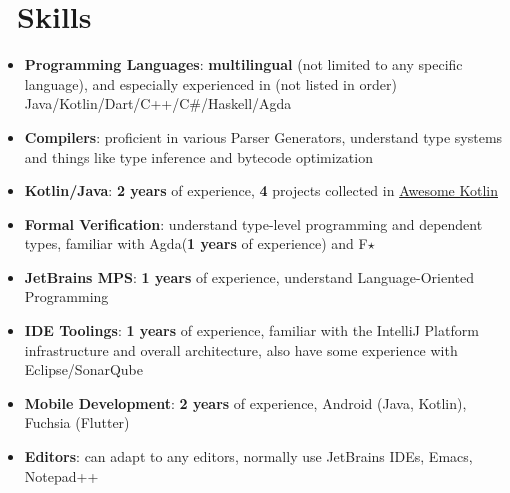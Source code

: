 \documentclass{style/resume2}
\begin{document}
\section{\faCogs\ Skills}
\begin{itemize}[parsep=0.5ex]
  \item \textbf{Programming Languages}:
    \textbf{multilingual} (not limited to any specific language),
    and especially experienced in (not listed in order) Java/Kotlin/Dart/C++/C\#/Haskell/Agda

  \item \textbf{Compilers}:
    proficient in various Parser Generators, understand type systems and things like type inference and bytecode optimization

  \item \textbf{Kotlin/Java}:
    \textbf{2 years} of experience,
    \textbf{4} projects collected in
    \href{https://kotlin.link/?q=ice} {Awesome Kotlin}

  \item \textbf{Formal Verification}:
    understand type-level programming and dependent types, familiar with Agda(\textbf{1 years} of experience) and F$\star$

  \item \textbf{JetBrains MPS}:
    \textbf{1 years} of experience,
    understand Language-Oriented Programming

  \item \textbf{IDE Toolings}:
    \textbf{1 years} of experience,
    familiar with the IntelliJ Platform infrastructure and overall architecture,
    also have some experience with Eclipse/SonarQube

  \item \textbf{Mobile Development}:
    \textbf{2 years} of experience,
    Android (Java, Kotlin), Fuchsia (Flutter)

  \item \textbf{Editors}:
    can adapt to any editors, normally use JetBrains IDEs, Emacs, Notepad++
\end{itemize}

\end{document}

